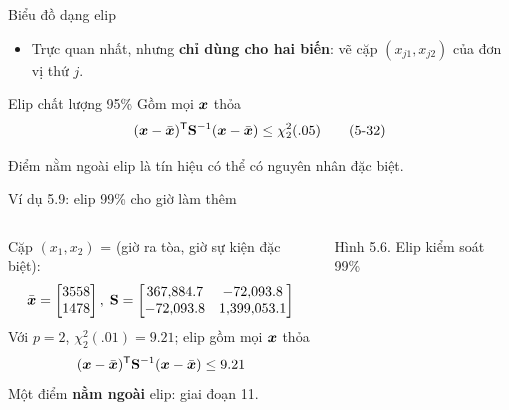 \begin{frame}{Biểu đồ dạng elip}
  \begin{itemize}
    \item Trực quan nhất, nhưng \textbf{chỉ dùng cho hai biến}: vẽ cặp \((x_{j1},x_{j2})\) của đơn vị thứ \(j\).
  \end{itemize}
  \begin{block}{Elip chất lượng 95\%}
    Gồm mọi \(\boldsymbol{x}\) thỏa
    \begin{equation}
      (\boldsymbol{x}-\bar{\boldsymbol{x}})^{\mathsf T}\mathbf{S}^{-1}(\boldsymbol{x}-\bar{\boldsymbol{x}})\le \chi^2_2(.05)
      \tag{5-32}
    \end{equation}
  \end{block}
  Điểm nằm ngoài elip là tín hiệu có thể có nguyên nhân đặc biệt.
\end{frame}

\begin{frame}{Ví dụ 5.9: elip 99\% cho giờ làm thêm}
  \begin{columns}[T]
    Cặp \((x_1,x_2)\) = (giờ ra tòa, giờ sự kiện đặc biệt):
    {\small
    \begin{equation*}
      \bar{\boldsymbol{x}}=\begin{bmatrix}3558\\1478\end{bmatrix},\;
      \mathbf{S}=\begin{bmatrix}367{,}884.7 & -72{,}093.8\\ -72{,}093.8 & 1{,}399{,}053.1\end{bmatrix}
    \end{equation*}}
    Với \(p=2\), \(\chi^2_2(.01)=9.21\); elip gồm mọi \(\boldsymbol{x}\) thỏa
    \begin{equation*}
      (\boldsymbol{x}-\bar{\boldsymbol{x}})^{\mathsf T}\mathbf{S}^{-1}(\boldsymbol{x}-\bar{\boldsymbol{x}})\le 9.21
    \end{equation*}
    Một điểm \textbf{nằm ngoài} elip: giai đoạn 11.
    \centering
    \resizebox{\linewidth}{!}{}

    {\scriptsize Hình 5.6. Elip kiểm soát 99\%}
  \end{columns}
\end{frame}

